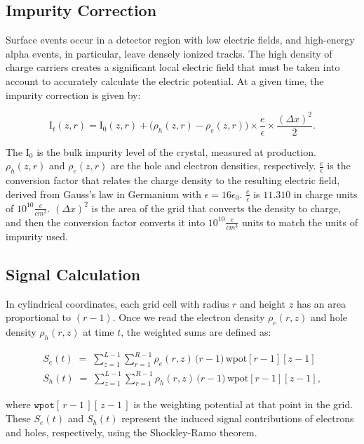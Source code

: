 \subsection{Impurity Correction}
Surface events occur in a detector region with low electric fields, and high-energy alpha events, in particular, leave densely ionized tracks. The high density of charge carriers creates a significant local electric field that must be taken into account to accurately calculate the electric potential. At a given time, the impurity correction is given by:

\begin{equation}
  {\text{I}_{t}}(z, r) = \text{I}_{0}(z, r) +
  \bigl( \rho_h(z, r) - \rho_e(z, r) \bigr) \times \frac{e}{\epsilon} \times \frac{(\Delta x)^2}{2}.
\end{equation}

\noindent
The $\text{I}_{0}$ is the bulk impurity level of the crystal, measured at production. $\rho_h(z,r)$ and $\rho_e(z,r)$ are the hole and electron densities, respectively. $\frac{e}{\epsilon}$ is the conversion factor that relates the charge density to the resulting electric field, derived from Gauss's law in Germanium with $\epsilon = 16\epsilon_0$. $\frac{e}{\epsilon}$ is $11.310$ in
charge units of $10^{10}\frac{e}{cm^3}$. $(\Delta x)^2$ is the area of the grid that converts the density to charge, and then the conversion factor converts it into $10^{10}\frac{e}{cm^3}$ units to match the units of impurity used.

\subsection{Signal Calculation}
In cylindrical coordinates, each grid cell with radius $r$ and height $z$ has an area proportional to $(r - 1)$. Once we read the electron density $\rho_e(r,z)$ and hole density $\rho_h(r,z)$ at time $t$, the weighted sums are defined as:

\begin{align}
S_e(t) \;=\; \sum_{z=1}^{L-1} \sum_{r=1}^{R-1}
   \rho_e(r,z)\,\bigl(r-1\bigr)\,\text{wpot}[r-1][z-1]\\
S_h(t) \;=\; \sum_{z=1}^{L-1} \sum_{r=1}^{R-1}
   \rho_h(r,z)\,\bigl(r-1\bigr)\,\text{wpot}[r-1][z-1],
\end{align}

\noindent
where $\texttt{wpot}[\,r-1\,][\,z-1\,]$ is the weighting potential at that point in the grid. These $S_e(t)$ and $S_h(t)$ represent the induced signal contributions of electrons and holes, respectively, using the Shockley-Ramo theorem.


